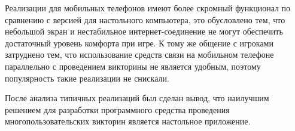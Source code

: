 Реализации для мобильных телефонов имеют более скромный функционал по сравнению с версией для настольного компьютера, это обусловлено тем, что небольшой экран и нестабильное интернет-соединение
не могут обеспечить достаточный уровень комфорта при игре. К тому же общение с игроками затруднено тем, что использование средств связи на мобильном телефоне параллельно с проведением викторины
не является удобным, поэтому популярность такие реализации не снискали.

После анализа типичных реализаций был сделан вывод, что наилучшим решением для разработки программного средства проведения многопользовательских викторин является настольное приложение.
